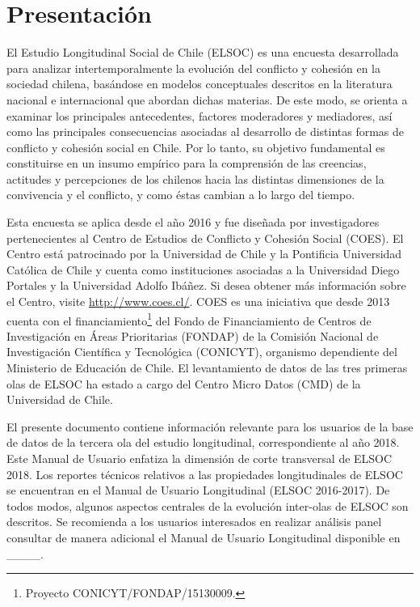 \documentclass[
  openany]{book}
\begin{document}
\begin{minipage}[b]{1\linewidth}
    \listoftables
\end{minipage}

\begin{minipage}[b]{1\linewidth}
    \listoffigures
\end{minipage}


\hypertarget{presentacion}{%
\chapter{Presentación}\label{presentacion}}

El Estudio Longitudinal Social de Chile (ELSOC) es una encuesta desarrollada para analizar intertemporalmente la evolución del conflicto y cohesión en la sociedad chilena, basándose en modelos conceptuales descritos en la literatura nacional e internacional que abordan dichas materias.
De este modo, se orienta a examinar los principales antecedentes, factores moderadores y mediadores, así como las principales consecuencias asociadas al desarrollo de distintas formas de conflicto y cohesión social en Chile. Por lo tanto, su objetivo fundamental es constituirse en un insumo empírico para la comprensión de las creencias, actitudes y percepciones de los chilenos hacia las distintas dimensiones de la convivencia y el conflicto, y como éstas cambian a lo largo del tiempo.

Esta encuesta se aplica desde el año 2016 y fue diseñada por investigadores pertenecientes al Centro de Estudios de Conflicto y Cohesión Social (COES). El Centro está patrocinado por la Universidad de Chile y la Pontificia Universidad Católica de Chile y cuenta como instituciones asociadas a la Universidad Diego Portales y la Universidad Adolfo Ibáñez. Si desea obtener más información sobre el Centro, visite \url{http://www.coes.cl/}. COES es una iniciativa que desde 2013 cuenta con el financiamiento\footnote{Proyecto CONICYT/FONDAP/15130009.} del Fondo de Financiamiento de Centros de Investigación en Áreas Prioritarias (FONDAP) de la Comisión Nacional de Investigación Científica y Tecnológica (CONICYT), organismo dependiente del Ministerio de Educación de Chile. El levantamiento de datos de las tres primeras olas de ELSOC ha estado a cargo del Centro Micro Datos (CMD) de la Universidad de Chile.

El presente documento contiene información relevante para los usuarios de la base de datos de la tercera ola del estudio longitudinal, correspondiente al año 2018. Este Manual de Usuario enfatiza la dimensión de corte transversal de ELSOC 2018. Los reportes técnicos relativos a las propiedades longitudinales de ELSOC se encuentran en el Manual de Usuario Longitudinal (ELSOC 2016-2017). De todos modos, algunos aspectos centrales de la evolución inter-olas de ELSOC son descritos. Se recomienda a los usuarios interesados en realizar análisis panel consultar de manera adicional el Manual de Usuario Longitudinal disponible en \_\_\_\_.
\end{document}
